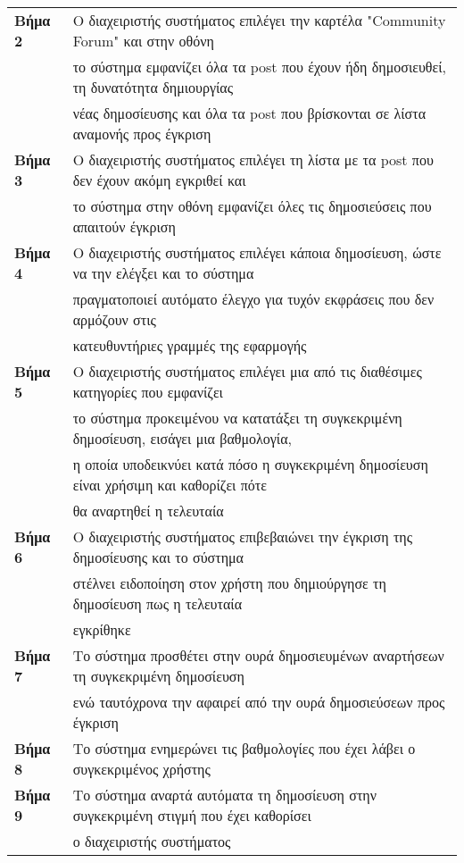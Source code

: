 \documentclass{article}
\newcommand\T{\rule{0pt}{2.6ex}}       %
\newcommand\B{\rule[-1.2ex]{0pt}{0pt}}
\begin{document}
  \begin{center}
     \begin{tabular}{|l|l|}
     \hline
      \textbf{Βήμα 2} & Ο διαχειριστής συστήματος επιλέγει την καρτέλα "Community Forum" και στην οθόνη \T \\& το σύστημα εμφανίζει όλα τα post που έχουν ήδη δημοσιευθεί, τη δυνατότητα δημιουργίας \\& νέας δημοσίευσης και όλα τα post που βρίσκονται σε λίστα αναμονής προς έγκριση \B \\
      \hline
      \textbf{Βήμα 3} & Ο διαχειριστής συστήματος επιλέγει τη λίστα με τα post που δεν έχουν ακόμη εγκριθεί και \T \\& το σύστημα στην οθόνη εμφανίζει όλες τις δημοσιεύσεις που απαιτούν έγκριση \B \\
      \hline
      \textbf{Βήμα 4} & Ο διαχειριστής συστήματος επιλέγει κάποια δημοσίευση, ώστε να την ελέγξει και το σύστημα \T \\& πραγματοποιεί αυτόματο έλεγχο για τυχόν εκφράσεις που δεν αρμόζουν στις \\& κατευθυντήριες γραμμές της εφαρμογής \B \\ 
      \hline
      \textbf{Βήμα 5} & Ο διαχειριστής συστήματος επιλέγει μια από τις διαθέσιμες κατηγορίες που εμφανίζει \T \\& το σύστημα προκειμένου να κατατάξει τη συγκεκριμένη δημοσίευση, εισάγει μια βαθμολογία, \\& η οποία υποδεικνύει κατά πόσο η συγκεκριμένη δημοσίευση είναι χρήσιμη και καθορίζει πότε \\& θα αναρτηθεί η τελευταία \B \\
      \hline
      \textbf{Βήμα 6} & Ο διαχειριστής συστήματος επιβεβαιώνει την έγκριση της δημοσίευσης και το σύστημα \T \\& στέλνει ειδοποίηση στον χρήστη που δημιούργησε τη δημοσίευση πως η τελευταία \\&  εγκρίθηκε \B \\
      \hline
      \textbf{Βήμα 7} & Το σύστημα προσθέτει στην ουρά δημοσιευμένων αναρτήσεων τη συγκεκριμένη δημοσίευση \T \\& ενώ ταυτόχρονα την αφαιρεί από την ουρά δημοσιεύσεων προς έγκριση \B \\ 
      \hline
      \textbf{Βήμα 8} & Το σύστημα ενημερώνει τις βαθμολογίες που έχει λάβει ο συγκεκριμένος χρήστης \T\B \\ 
      \hline
      \textbf{Βήμα 9} & Το σύστημα αναρτά αυτόματα τη δημοσίευση στην συγκεκριμένη στιγμή που έχει καθορίσει \T \\& ο διαχειριστής συστήματος \B \\ 
      \hline
     \end{tabular}
 \end{center}
 
\end{document}
